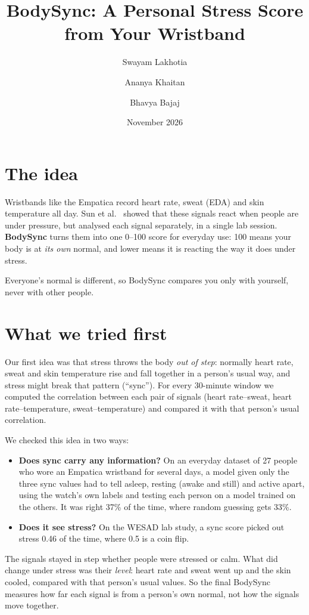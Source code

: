 \documentclass{article}
\title{BodySync: A Personal Stress Score from Your Wristband}
\author{Swayam Lakhotia \and Ananya Khaitan \and Bhavya Bajaj}
\date{November 2026}
\begin{document}
\maketitle

\section{The idea}

Wristbands like the Empatica record heart rate, sweat (EDA) and skin temperature all day. Sun et al.~\cite{sun2026trust} showed that these signals react when people are under pressure, but analysed each signal separately, in a single lab session. \textbf{BodySync} turns them into one 0--100 score for everyday use: 100 means your body is at \emph{its own} normal, and lower means it is reacting the way it does under stress.

Everyone's normal is different, so BodySync compares you only with yourself, never with other people.

\section{What we tried first}

Our first idea was that stress throws the body \emph{out of step}: normally heart rate, sweat and skin temperature rise and fall together in a person's usual way, and stress might break that pattern (``sync''). For every 30-minute window we computed the correlation between each pair of signals (heart rate--sweat, heart rate--temperature, sweat--temperature) and compared it with that person's usual correlation.

We checked this idea in two ways:
\begin{itemize}
\item \textbf{Does sync carry any information?} On an everyday dataset of 27 people who wore an Empatica wristband for several days, a model given only the three sync values had to tell asleep, resting (awake and still) and active apart, using the watch's own labels and testing each person on a model trained on the others. It was right 37\% of the time, where random guessing gets 33\%.
\item \textbf{Does it see stress?} On the WESAD lab study, a sync score picked out stress 0.46 of the time, where 0.5 is a coin flip.
\end{itemize}

The signals stayed in step whether people were stressed or calm. What did change under stress was their \emph{level}: heart rate and sweat went up and the skin cooled, compared with that person's usual values. So the final BodySync measures how far each signal is from a person's own normal, not how the signals move together.
\end{document}
